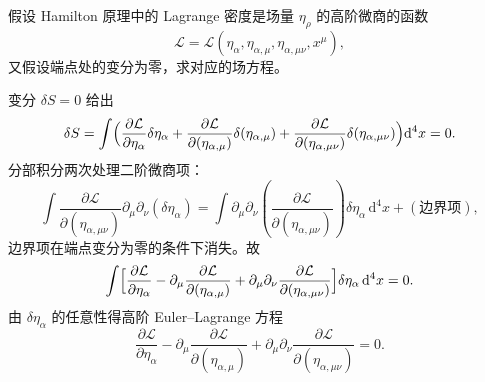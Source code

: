 \begin{question}
假设 Hamilton 原理中的 Lagrange 密度是场量 \(\eta_\rho\) 的高阶微商的函数
\[
\mathcal L = \mathcal L(\eta_\alpha,\eta_{\alpha,\mu},\eta_{\alpha,\mu\nu},x^\mu),
\]
又假设端点处的变分为零，求对应的场方程。
\begin{solution}
变分 \(\delta S=0\) 给出
\[
\delta S = \int\Bigl(
\frac{\partial\mathcal L}{\partial\eta_\alpha}\delta\eta_\alpha
+\frac{\partial\mathcal L}{\partial(\eta_{\alpha,\mu})}\delta(\eta_{\alpha,\mu})
+\frac{\partial\mathcal L}{\partial(\eta_{\alpha,\mu\nu})}\delta(\eta_{\alpha,\mu\nu})
\Bigr)\mathrm d^4x = 0 .
\]
分部积分两次处理二阶微商项：
\[
\int\frac{\partial\mathcal L}{\partial(\eta_{\alpha,\mu\nu})}\partial_\mu\partial_\nu(\delta\eta_\alpha)
= \int\partial_\mu\partial_\nu\!\left(\frac{\partial\mathcal L}{\partial(\eta_{\alpha,\mu\nu})}\right)
\delta\eta_\alpha\,\mathrm d^4x
+(\text{边界项}),
\]
边界项在端点变分为零的条件下消失。故
\[
\int\Bigl[
\frac{\partial\mathcal L}{\partial\eta_\alpha}
-\partial_\mu\frac{\partial\mathcal L}{\partial(\eta_{\alpha,\mu})}
+\partial_\mu\partial_\nu\frac{\partial\mathcal L}{\partial(\eta_{\alpha,\mu\nu})}
\Bigr]\delta\eta_\alpha\,\mathrm d^4x = 0 .
\]
由 \(\delta\eta_\alpha\) 的任意性得高阶 Euler--Lagrange 方程
\[
\frac{\partial\mathcal L}{\partial\eta_\alpha}
-\partial_\mu\frac{\partial\mathcal L}{\partial(\eta_{\alpha,\mu})}
+\partial_\mu\partial_\nu\frac{\partial\mathcal L}{\partial(\eta_{\alpha,\mu\nu})}=0 .
\]
\end{solution}
\end{question}


